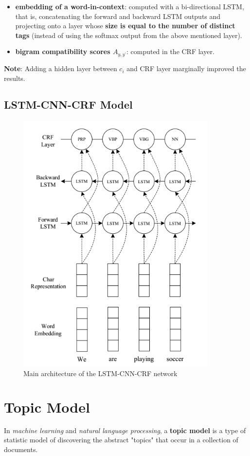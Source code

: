 \documentclass[a3paper, 12pt]{book} %
\begin{document}
\begin{itemize}
	\item \textbf{embedding of a word-in-context}: computed with a bi-directional LSTM, that is,  concatenating the forward and backward LSTM outputs and projecting onto  a layer whose \textbf{size is equal to the number of distinct tags} (instead of using the softmax output from the above mentioned layer). 
	\item \textbf{bigram compatibility scores $A_{y,y^{\prime}}$}: computed in the CRF layer.
\end{itemize}

\textbf{Note}: Adding a hidden layer between $c_i$ and CRF layer marginally improved the results.

\section{LSTM-CNN-CRF Model}
\begin{figure}[htpb]
	\centering
	\includegraphics[width=10cm]{figures/lstm_cnn_crf.png}
	\caption{Main architecture of the LSTM-CNN-CRF network}
	\label{fig:boat1}
\end{figure}

\chapter{Topic Model}
In \emph{machine learning} and \emph{natural language processing}, a \textbf{topic model} is a type of statistic model of discovering the abstract "topics" that occur in a collection of documents.
\end{document}
